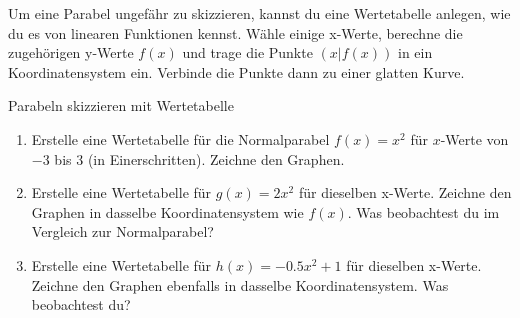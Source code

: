 Um eine Parabel ungefähr zu skizzieren, kannst du eine Wertetabelle anlegen, wie du es von linearen Funktionen kennst. Wähle einige x-Werte, berechne die zugehörigen y-Werte $f(x)$ und trage die Punkte $(x|f(x))$ in ein Koordinatensystem ein. Verbinde die Punkte dann zu einer glatten Kurve.

\begin{aufgabenumgebung}{Parabeln skizzieren mit Wertetabelle}
\begin{enumerate}
    \item Erstelle eine Wertetabelle für die Normalparabel $f(x)=x^2$ für $x$-Werte von $-3$ bis $3$ (in Einerschritten). Zeichne den Graphen.
    \item Erstelle eine Wertetabelle für $g(x)=2x^2$ für dieselben x-Werte. Zeichne den Graphen in dasselbe Koordinatensystem wie $f(x)$. Was beobachtest du im Vergleich zur Normalparabel?
    \item Erstelle eine Wertetabelle für $h(x)=-0.5x^2+1$ für dieselben x-Werte. Zeichne den Graphen ebenfalls in dasselbe Koordinatensystem. Was beobachtest du?
\end{enumerate}
\end{aufgabenumgebung}



